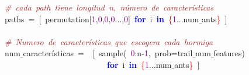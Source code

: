 \noindent
\mbox{}\textit{\textcolor{Brown}{\#\ cada\ path\ tiene\ longitud\ n,\ número\ de\ características}} \\
\mbox{}paths\ \textcolor{BrickRed}{=}\ \textcolor{BrickRed}{[}\ permutation\textcolor{BrickRed}{[}\textcolor{Purple}{1}\textcolor{BrickRed}{,}\textcolor{Purple}{0}\textcolor{BrickRed}{,}\textcolor{Purple}{0}\textcolor{BrickRed}{,}\textcolor{Purple}{0}\textcolor{BrickRed}{...,}\textcolor{Purple}{0}\textcolor{BrickRed}{]}\ \textbf{\textcolor{Blue}{for}}\ i\ \textbf{\textcolor{Blue}{in}}\ \textcolor{Red}{\{}\textcolor{Purple}{1}\textcolor{BrickRed}{...}num$\_$ants\textcolor{Red}{\}}\ \textcolor{BrickRed}{]} \\
\mbox{} \\
\mbox{}\textit{\textcolor{Brown}{\#\ Numero\ de\ características\ que\ escogera\ cada\ hormiga}} \\
\mbox{}num$\_$características\ \textcolor{BrickRed}{=}\ \ \textcolor{BrickRed}{[}\ sample\textcolor{BrickRed}{(}\ \textcolor{Purple}{0}\textcolor{BrickRed}{:}n\textcolor{BrickRed}{-}\textcolor{Purple}{1}\textcolor{BrickRed}{,}\ prob\textcolor{BrickRed}{=}trail$\_$num$\_$features\textcolor{BrickRed}{)} \\
\mbox{}\ \ \ \ \ \ \ \ \ \ \ \ \ \ \ \ \ \ \ \ \ \ \ \ \ \textbf{\textcolor{Blue}{for}}\ i\ \textbf{\textcolor{Blue}{in}}\ \textcolor{Red}{\{}\textcolor{Purple}{1}\textcolor{BrickRed}{...}num$\_$ants\textcolor{Red}{\}}\ \textcolor{BrickRed}{]} \\
\mbox{}
